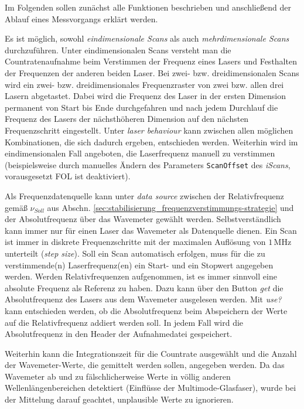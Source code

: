 Im Folgenden sollen zunächst alle Funktionen beschrieben und
anschließend der Ablauf eines Messvorgangs erklärt werden.\par
Es ist möglich, sowohl \textit{eindimensionale Scans} als auch
\textit{mehrdimensionale Scans} durchzuführen. Unter eindimensionalen Scans
versteht man die Countratenaufnahme beim Verstimmen der Frequenz eines Lasers
und Festhalten der Frequenzen der anderen beiden Laser. Bei zwei- bzw.
dreidimensionalen Scans wird ein zwei- bzw. dreidimensionales Frequenzraster von
zwei bzw. allen drei Lasern abgetastet. Dabei wird die Frequenz des Laser in der
ersten Dimension permanent von Start bis Ende durchgefahren und nach jedem
Durchlauf die Frequenz des Lasers der nächsthöheren Dimension auf den nächsten
Frequenzschritt eingestellt. Unter \textit{laser behaviour} kann zwischen
allen möglichen Kombinationen, die sich dadurch ergeben, entschieden werden.
Weiterhin wird im eindimensionalen Fall angeboten, die Laserfrequenz manuell zu
verstimmen (beispielsweise durch manuelles
Ändern des Parameters \lstinline|ScanOffset| des \textit{iScans}, 
vorausgesetzt FOL ist deaktiviert).\par
Als Frequenzdatenquelle kann unter \textit{data
source} zwischen der Relativfrequenz gemäß
$\nu_{Soll}$ aus Abschn. \ref{sec:stabilisierung_frequenzverstimmungs-strategie}
und der Absolutfrequenz über das Wavemeter gewählt werden. Selbstverständlich
kann immer nur für einen Laser das Wavemeter als Datenquelle dienen. Ein Scan ist immer in
diskrete Frequenzschritte mit der maximalen Auflösung von $1\,$MHz unterteilt
(\textit{step size}). Soll ein Scan automatisch erfolgen, muss für die zu
verstimmende(n) Laserfrequenz(en) ein Start- und ein Stopwert angegeben werden.
Werden Relativfrequenzen aufgenommen, ist es immer sinnvoll eine absolute
Frequenz als Referenz zu haben. Dazu kann über den Button \textit{get} die
Absolutfrequenz des Lasers aus dem Wavemeter ausgelesen werden. Mit
\textit{use?} kann entschieden werden, ob die Absolutfrequenz beim Abspeichern
der Werte auf die Relativfrequenz addiert werden soll. In jedem Fall wird die
Absolutfrequenz in den Header der Aufnahmedatei gespeichert.\par
Weiterhin kann die Integrationszeit für die Countrate ausgewählt und die Anzahl
der Wavemeter-Werte, die gemittelt werden sollen, angegeben werden. Da das
Wavemeter ab und zu fälschlicherweise Werte in völlig anderen
Wellenlängenbereichen detektiert (Einflüsse der Multimode-Glasfaser), wurde bei
der Mittelung darauf geachtet, unplausible Werte zu ignorieren.\par
